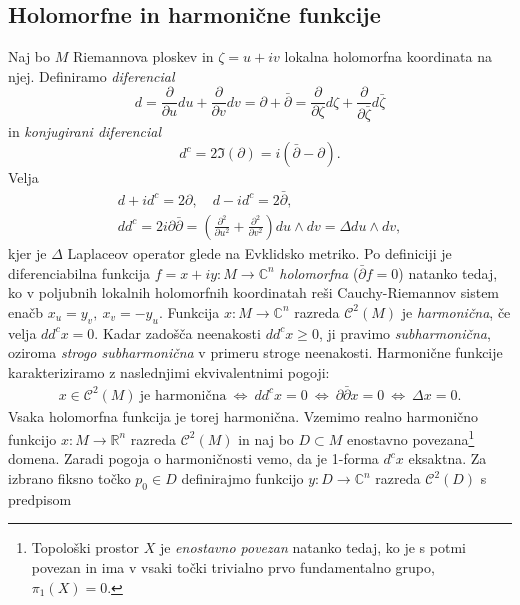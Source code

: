 \documentclass[12pt,a4paper,twoside]{article}
\theoremstyle{definition} %
\theoremstyle{plain} %
\numberwithin{equation}{section}  %
\begin{document}
\subsection{Holomorfne in harmonične funkcije}
%
Naj bo $M$ Riemannova ploskev in $\zeta = u+iv$ lokalna holomorfna koordinata na njej. 
Definiramo \emph{diferencial} 
\begin{equation}
d = \frac{\partial}{\partial u}du + \frac{\partial}{\partial v}dv = \partial + \bar{\partial} = \frac{\partial}{\partial \zeta}d\zeta + \frac{\partial}{\partial \bar{\zeta}}d\bar{\zeta}
\end{equation}
in \emph{konjugirani diferencial}
\begin{equation}
d^{c} = 2 \Im(\partial) = i(\bar{\partial} - \partial).
\end{equation}
Velja
\begin{gather*}
d + id^{c} = 2\partial , \quad  d - id^{c} = 2\bar{\partial}, \\
dd^{c} = 2i\partial \bar{\partial} = \left( \frac{\partial^2}{\partial u^2} + \frac{\partial^2}{\partial v^2} \right) du \wedge dv = \Delta du \wedge dv,
\end{gather*}
kjer je $\Delta$ Laplaceov operator glede na Evklidsko metriko.\newline
%
Po definiciji je diferenciabilna funkcija $f = x + iy \colon M \to \mathbb{C}^{n}$ \emph{holomorfna} ($\bar{\partial}f = 0$) natanko tedaj, ko v poljubnih lokalnih holomorfnih koordinatah reši Cauchy-Riemannov sistem enačb $x_{u}=y_{v}, \ x_{v}=-y_{u}$.\newline
%
Funkcija $x \colon M \to \mathbb{C}^{n}$ razreda $\mathcal{C}^2(M)$ je \emph{harmonična}, če velja $dd^{c}x=0$.
Kadar zadošča neenakosti $dd^{c}x \geq 0$, ji pravimo \emph{subharmonična}, oziroma \emph{strogo subharmonična} v primeru stroge neenakosti.
Harmonične funkcije karakteriziramo z naslednjimi ekvivalentnimi pogoji:
\begin{gather*}
x \in \mathcal{C}^2(M) \ \text{je harmonična} \ \iff \ dd^{c}x=0 \ \iff \ \partial \bar{\partial}x=0 \ \iff \ \Delta x=0.
\end{gather*}
Vsaka holomorfna funkcija je torej harmonična. 
Vzemimo realno harmonično funkcijo $x \colon M \to \mathbb{R}^{n}$ razreda $\mathcal{C}^2(M)$ in naj bo $D \subset M$ enostavno povezana\footnote{Topološki prostor $X$ je \emph{enostavno povezan} natanko tedaj, ko je s potmi povezan in ima v vsaki točki trivialno prvo fundamentalno grupo, $\pi_{1}(X)=0$.} domena. Zaradi pogoja o harmoničnosti vemo, da je 1-forma $d^{c}x$ eksaktna. Za izbrano fiksno točko $p_{0} \in D$ definirajmo funkcijo $y \colon D \to \mathbb{C}^{n}$ razreda $\mathcal{C}^2(D)$ s predpisom
\end{document}

